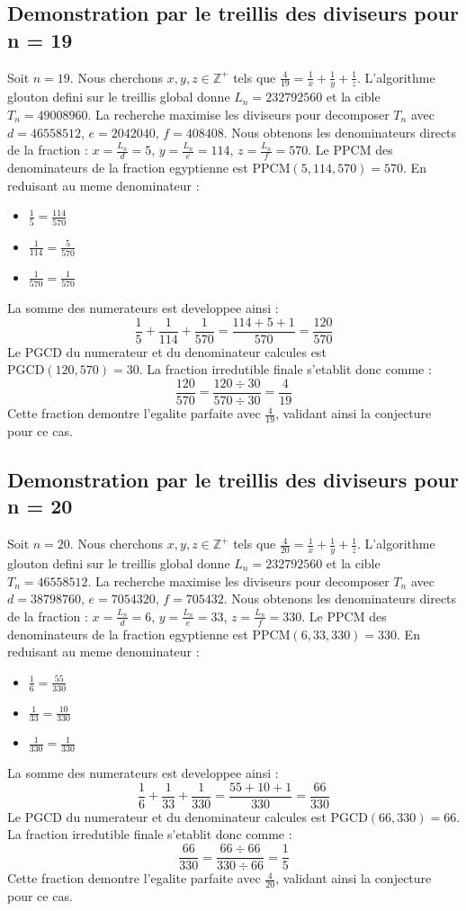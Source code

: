 \documentclass[11pt,a4paper]{article}
\begin{document}
\subsection{Demonstration par le treillis des diviseurs pour n = 19}
Soit $n = 19$. Nous cherchons $x, y, z \in \mathbb{Z}^{+}$ tels que $\frac{4}{19} = \frac{1}{x} + \frac{1}{y} + \frac{1}{z}$.
L'algorithme glouton defini sur le treillis global donne $L_n = 232792560$ et la cible $T_n = 49008960$.
La recherche maximise les diviseurs pour decomposer $T_n$ avec $d = 46558512$, $e = 2042040$, $f = 408408$.
Nous obtenons les denominateurs directs de la fraction : $x = \frac{L_n}{d} = 5$, $y = \frac{L_n}{e} = 114$, $z = \frac{L_n}{f} = 570$.
Le PPCM des denominateurs de la fraction egyptienne est $\text{PPCM}(5, 114, 570) = 570$.
En reduisant au meme denominateur :
\begin{itemize}
    \item $\frac{1}{5} = \frac{114}{570}$
    \item $\frac{1}{114} = \frac{5}{570}$
    \item $\frac{1}{570} = \frac{1}{570}$
\end{itemize}
La somme des numerateurs est developpee ainsi :
$$ \frac{1}{5} + \frac{1}{114} + \frac{1}{570} = \frac{114 + 5 + 1}{570} = \frac{120}{570} $$
Le PGCD du numerateur et du denominateur calcules est $\text{PGCD}(120, 570) = 30$.
La fraction irredutible finale s'etablit donc comme :
$$ \frac{120}{570} = \frac{120 \div 30}{570 \div 30} = \frac{4}{19} $$
Cette fraction demontre l'egalite parfaite avec $\frac{4}{19}$, validant ainsi la conjecture pour ce cas.

\subsection{Demonstration par le treillis des diviseurs pour n = 20}
Soit $n = 20$. Nous cherchons $x, y, z \in \mathbb{Z}^{+}$ tels que $\frac{4}{20} = \frac{1}{x} + \frac{1}{y} + \frac{1}{z}$.
L'algorithme glouton defini sur le treillis global donne $L_n = 232792560$ et la cible $T_n = 46558512$.
La recherche maximise les diviseurs pour decomposer $T_n$ avec $d = 38798760$, $e = 7054320$, $f = 705432$.
Nous obtenons les denominateurs directs de la fraction : $x = \frac{L_n}{d} = 6$, $y = \frac{L_n}{e} = 33$, $z = \frac{L_n}{f} = 330$.
Le PPCM des denominateurs de la fraction egyptienne est $\text{PPCM}(6, 33, 330) = 330$.
En reduisant au meme denominateur :
\begin{itemize}
    \item $\frac{1}{6} = \frac{55}{330}$
    \item $\frac{1}{33} = \frac{10}{330}$
    \item $\frac{1}{330} = \frac{1}{330}$
\end{itemize}
La somme des numerateurs est developpee ainsi :
$$ \frac{1}{6} + \frac{1}{33} + \frac{1}{330} = \frac{55 + 10 + 1}{330} = \frac{66}{330} $$
Le PGCD du numerateur et du denominateur calcules est $\text{PGCD}(66, 330) = 66$.
La fraction irredutible finale s'etablit donc comme :
$$ \frac{66}{330} = \frac{66 \div 66}{330 \div 66} = \frac{1}{5} $$
Cette fraction demontre l'egalite parfaite avec $\frac{4}{20}$, validant ainsi la conjecture pour ce cas.
\end{document}
